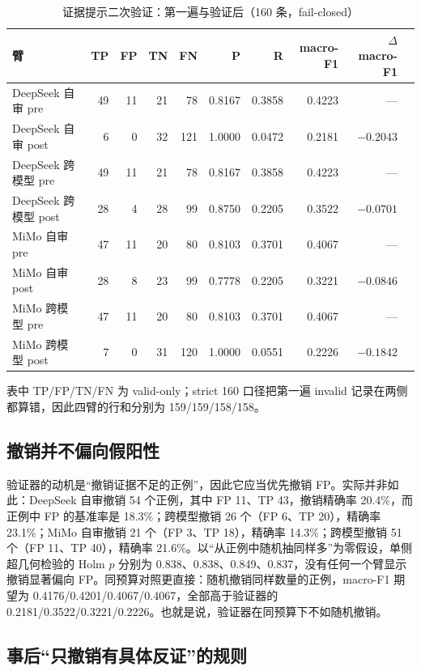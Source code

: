 \documentclass[conference]{IEEEtran}
\begin{document}
\begin{table}[t]
\caption{证据提示二次验证：第一遍与验证后（160 条，fail-closed）}
\label{tab:verify}
\centering
\scriptsize
\setlength{\tabcolsep}{3.2pt}
\begin{tabular}{@{}lrrrrrrrrr@{}}
\toprule
臂 & TP & FP & TN & FN & P & R & macro-F1 & $\Delta$macro-F1\\
\midrule
DeepSeek 自审 pre & 49 & 11 & 21 & 78 & 0.8167 & 0.3858 & 0.4223 & ---\\
DeepSeek 自审 post & 6 & 0 & 32 & 121 & 1.0000 & 0.0472 & 0.2181 & $-0.2043$\\
DeepSeek 跨模型 pre & 49 & 11 & 21 & 78 & 0.8167 & 0.3858 & 0.4223 & ---\\
DeepSeek 跨模型 post & 28 & 4 & 28 & 99 & 0.8750 & 0.2205 & 0.3522 & $-0.0701$\\
MiMo 自审 pre & 47 & 11 & 20 & 80 & 0.8103 & 0.3701 & 0.4067 & ---\\
MiMo 自审 post & 28 & 8 & 23 & 99 & 0.7778 & 0.2205 & 0.3221 & $-0.0846$\\
MiMo 跨模型 pre & 47 & 11 & 20 & 80 & 0.8103 & 0.3701 & 0.4067 & ---\\
MiMo 跨模型 post & 7 & 0 & 31 & 120 & 1.0000 & 0.0551 & 0.2226 & $-0.1842$\\
\bottomrule
\end{tabular}
\end{table}

表中 TP/FP/TN/FN 为 valid-only；strict 160 口径把第一遍 invalid 记录在两侧都算错，因此四臂的行和分别为 159/159/158/158。

\subsection{撤销并不偏向假阳性}

验证器的动机是“撤销证据不足的正例”，因此它应当优先撤销 FP。实际并非如此：DeepSeek 自审撤销 54 个正例，其中 FP 11、TP 43，撤销精确率 20.4\%，而正例中 FP 的基准率是 18.3\%；跨模型撤销 26 个（FP 6、TP 20），精确率 23.1\%；MiMo 自审撤销 21 个（FP 3、TP 18），精确率 14.3\%；跨模型撤销 51 个（FP 11、TP 40），精确率 21.6\%。以“从正例中随机抽同样多”为零假设，单侧超几何检验的 Holm $p$ 分别为 0.838、0.838、0.849、0.837，没有任何一个臂显示撤销显著偏向 FP。同预算对照更直接：随机撤销同样数量的正例，macro-F1 期望为 0.4176/0.4201/0.4067/0.4067，全部高于验证器的 0.2181/0.3522/0.3221/0.2226。也就是说，验证器在同预算下不如随机撤销。

\subsection{事后“只撤销有具体反证”的规则}
\end{document}
